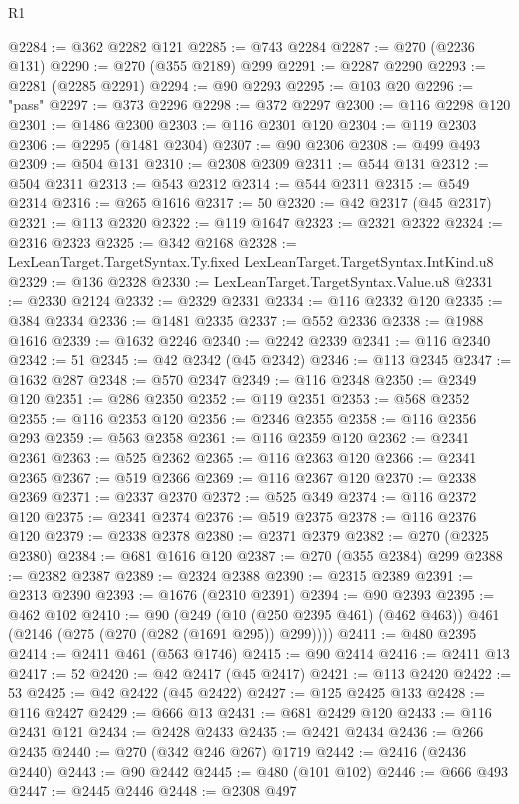\begin{lexlean}{R1}
\begin{coremodule}
@2284 := @362 @2282 @121
@2285 := @743 @2284
@2287 := @270 (@2236 @131)
@2290 := @270 (@355 @2189) @299
@2291 := @2287 @2290
@2293 := @2281 (@2285 @2291)
@2294 := @90 @2293
@2295 := @103 @20
@2296 := "pass"
@2297 := @373 @2296
@2298 := @372 @2297
@2300 := @116 @2298 @120
@2301 := @1486 @2300
@2303 := @116 @2301 @120
@2304 := @119 @2303
@2306 := @2295 (@1481 @2304)
@2307 := @90 @2306
@2308 := @499 @493
@2309 := @504 @131
@2310 := @2308 @2309
@2311 := @544 @131
@2312 := @504 @2311
@2313 := @543 @2312
@2314 := @544 @2311
@2315 := @549 @2314
@2316 := @265 @1616
@2317 := 50
@2320 := @42 @2317 (@45 @2317)
@2321 := @113 @2320
@2322 := @119 @1647
@2323 := @2321 @2322
@2324 := @2316 @2323
@2325 := @342 @2168
@2328 := LexLeanTarget.TargetSyntax.Ty.fixed LexLeanTarget.TargetSyntax.IntKind.u8
@2329 := @136 @2328
@2330 := LexLeanTarget.TargetSyntax.Value.u8
@2331 := @2330 @2124
@2332 := @2329 @2331
@2334 := @116 @2332 @120
@2335 := @384 @2334
@2336 := @1481 @2335
@2337 := @552 @2336
@2338 := @1988 @1616
@2339 := @1632 @2246
@2340 := @2242 @2339
@2341 := @116 @2340
@2342 := 51
@2345 := @42 @2342 (@45 @2342)
@2346 := @113 @2345
@2347 := @1632 @287
@2348 := @570 @2347
@2349 := @116 @2348
@2350 := @2349 @120
@2351 := @286 @2350
@2352 := @119 @2351
@2353 := @568 @2352
@2355 := @116 @2353 @120
@2356 := @2346 @2355
@2358 := @116 @2356 @293
@2359 := @563 @2358
@2361 := @116 @2359 @120
@2362 := @2341 @2361
@2363 := @525 @2362
@2365 := @116 @2363 @120
@2366 := @2341 @2365
@2367 := @519 @2366
@2369 := @116 @2367 @120
@2370 := @2338 @2369
@2371 := @2337 @2370
@2372 := @525 @349
@2374 := @116 @2372 @120
@2375 := @2341 @2374
@2376 := @519 @2375
@2378 := @116 @2376 @120
@2379 := @2338 @2378
@2380 := @2371 @2379
@2382 := @270 (@2325 @2380)
@2384 := @681 @1616 @120
@2387 := @270 (@355 @2384) @299
@2388 := @2382 @2387
@2389 := @2324 @2388
@2390 := @2315 @2389
@2391 := @2313 @2390
@2393 := @1676 (@2310 @2391)
@2394 := @90 @2393
@2395 := @462 @102
@2410 := @90
    (@249 (@10 (@250 @2395 @461) (@462 @463)) @461 (@2146 (@275 (@270 (@282 (@1691 @295)) @299))))
@2411 := @480 @2395
@2414 := @2411 @461 (@563 @1746)
@2415 := @90 @2414
@2416 := @2411 @13
@2417 := 52
@2420 := @42 @2417 (@45 @2417)
@2421 := @113 @2420
@2422 := 53
@2425 := @42 @2422 (@45 @2422)
@2427 := @125 @2425 @133
@2428 := @116 @2427
@2429 := @666 @13
@2431 := @681 @2429 @120
@2433 := @116 @2431 @121
@2434 := @2428 @2433
@2435 := @2421 @2434
@2436 := @266 @2435
@2440 := @270 (@342 @246 @267) @1719
@2442 := @2416 (@2436 @2440)
@2443 := @90 @2442
@2445 := @480 (@101 @102)
@2446 := @666 @493
@2447 := @2445 @2446
@2448 := @2308 @497

\end{coremodule}
\end{lexlean}
